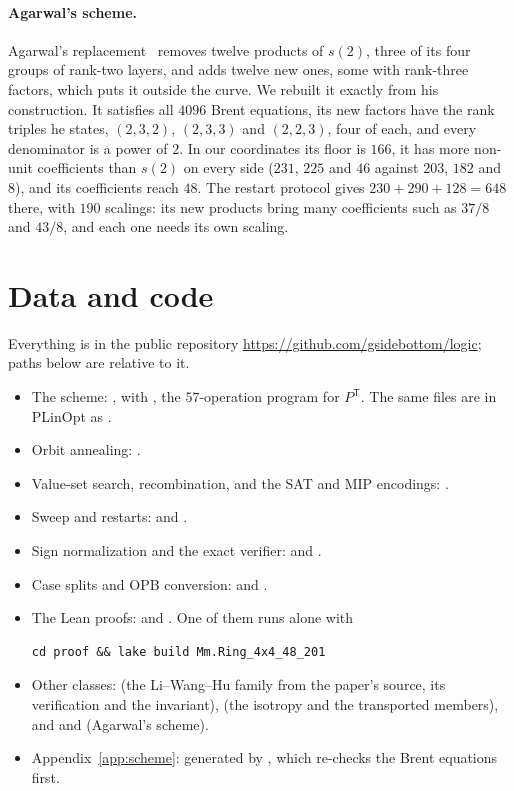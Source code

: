 \documentclass[11pt]{article}
\theoremstyle{remark}
\newcommand{\Pt}{P^{\mathsf T}}
\begin{document}
\paragraph{Agarwal's scheme.}  Agarwal's replacement~\cite{Agarwal26}
removes twelve products of $s(2)$, three of its four groups of rank-two
layers, and adds twelve new ones, some with rank-three factors, which
puts it outside the curve.  We rebuilt it exactly from his construction.
It satisfies all $4096$ Brent equations, its new factors have the rank
triples he states, $(2,3,2)$, $(2,3,3)$ and $(2,2,3)$, four of each, and
every denominator is a power of $2$.  In our coordinates its floor is
$166$, it has more non-unit coefficients than $s(2)$ on every side ($231$,
$225$ and $46$ against $203$, $182$ and $8$), and its coefficients reach
$48$.  The restart protocol gives $230+290+128=648$ there, with $190$
scalings: its new products bring many coefficients such as $37/8$ and
$43/8$, and each one needs its own scaling.

\section{Data and code}

Everything is in the public repository
\url{https://github.com/gsidebottom/logic}; paths below are relative to
it.
\begin{itemize}
\item The scheme: ,
  with , the $57$-operation program for $\Pt$.  The
  same files are in PLinOpt as .
\item Orbit annealing: .
\item Value-set search, recombination, and the SAT and MIP encodings:
  .
\item Sweep and restarts:  and
  .
\item Sign normalization and the exact verifier:
   and .
\item Case splits and OPB conversion:  and
  .
\item The Lean proofs:  and
  .  One of them runs alone with
\begin{verbatim}
cd proof && lake build Mm.Ring_4x4_48_201
\end{verbatim}
\item Other classes:  (the Li--Wang--Hu
  family from the paper's source, its verification and the invariant),
   (the isotropy and the transported members), and
   and 
  (Agarwal's scheme).
\item Appendix~\ref{app:scheme}: generated by
  , which re-checks the Brent
  equations first.
\end{itemize}
\end{document}
